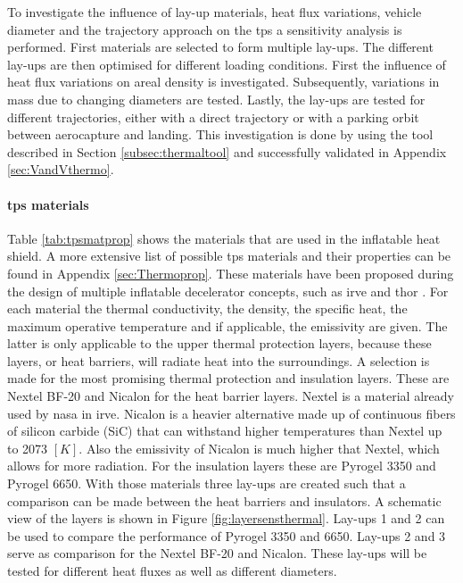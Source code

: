 To investigate the influence of lay-up materials, heat flux variations, vehicle diameter and the trajectory approach on the \gls{tps} a sensitivity analysis is performed. First materials are selected to form multiple lay-ups. The different lay-ups are then optimised for different loading conditions. First the influence of heat flux variations on areal density is investigated. Subsequently, variations in mass due to changing diameters are tested. Lastly, the lay-ups are tested for different trajectories, either with a direct trajectory or with a parking orbit between aerocapture and landing. This investigation is done by using the tool described in Section \ref{subsec:thermaltool} and successfully validated in Appendix \ref{sec:VandVthermo}.

\paragraph{\gls{tps} materials}
Table \ref{tab:tpsmatprop} shows the materials that are used in the inflatable heat shield. A more extensive list of possible \gls{tps} materials and their properties can be found in Appendix \ref{sec:Thermoprop}. These materials have been proposed during the design of multiple inflatable decelerator concepts, such as \gls{irve} and \gls{thor} \cite{Hughes2005}. For each material the thermal conductivity, the density, the specific heat, the maximum operative temperature and if applicable, the emissivity are given. The latter is only applicable to the upper thermal protection layers, because these layers, or heat barriers, will radiate heat into the surroundings.
\newline\newline
A selection is made for the most promising thermal protection and insulation layers. These are Nextel BF-20 and Nicalon for the heat barrier layers. Nextel is a material already used by \gls{nasa} in \gls{irve}. Nicalon is a heavier alternative made up of continuous fibers of silicon carbide (SiC) that can withstand higher temperatures than Nextel up to 2073 $\left[K\right]$. Also the emissivity of Nicalon is much higher that Nextel, which allows for more radiation. For the insulation layers these are Pyrogel 3350 and Pyrogel 6650. With those materials three lay-ups are created such that a comparison can be made between the heat barriers and insulators. A schematic view of the layers is shown in Figure \ref{fig:layersensthermal}. Lay-ups 1 and 2 can be used to compare the performance of Pyrogel 3350 and 6650. Lay-ups 2 and 3 serve as comparison for the Nextel BF-20 and Nicalon. These lay-ups will be tested for different heat fluxes as well as different diameters.

